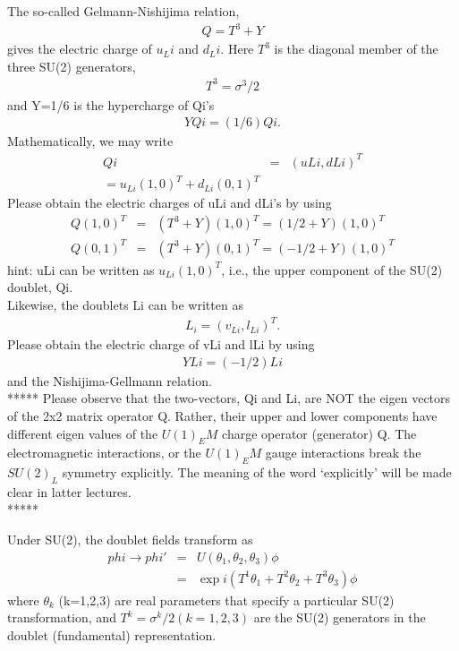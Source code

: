 \documentclass[12pt]{article}
\begin{document}
  The so-called Gelmann-Nishijima relation,
\begin{eqnarray}
  Q = T^3 + Y
\end{eqnarray}
  gives the electric charge of $u_Li$ and $d_Li$.  Here $T^3$ is the
  diagonal member of the three SU(2) generators,
  \begin{eqnarray}
  T^3 = \sigma^3 /2
  \end{eqnarray}
  and Y=1/6 is the hypercharge of Qi's
  \begin{eqnarray}
  Y Qi = (1/6) Qi .
  \end{eqnarray}
  Mathematically, we may write
  \begin{eqnarray}
  Qi &=& (uLi,dLi)^T \\
     = u_{Li} (1,0)^T + d_{Li} (0,1)^T
  \end{eqnarray}
  Please obtain the electric charges of uLi and dLi's
  by using
  \begin{eqnarray}
  Q (1,0)^T &=& (T^3 + Y) (1,0)^T = ( 1/2 + Y) (1,0)^T\\
  Q (0,1)^T &=& (T^3 + Y) (0,1)^T = (-1/2 + Y) (1,0)^T
  \end{eqnarray}
hint: uLi can be written as $u_{Li} (1,0)^T$, i.e., the upper
  component of the SU(2) doublet, Qi.\\

  Likewise, the doublets Li can be written as
  \begin{eqnarray}
  L_i = (v_{Li}, l_{Li})^T .
  \end{eqnarray}
  Please obtain the electric charge of vLi and lLi by using
  \begin{eqnarray}
  Y Li = (-1/2) Li
  \end{eqnarray}
  and the Nishijima-Gellmann relation.\\

  *****
  Please observe that the two-vectors, Qi and Li, are NOT the
  eigen vectors of the 2x2 matrix operator Q.  Rather, their
  upper and lower components have different eigen values of the
  $U(1)_EM$ charge operator (generator) Q.  The electromagnetic
  interactions, or the $U(1)_EM$ gauge interactions break the
  $SU(2)_L$ symmetry explicitly.  The meaning of the word `explicitly'
  will be made clear in latter lectures.\\
  *****

  Under SU(2), the doublet fields transform as
  \begin{eqnarray}
  phi \to phi' &=& U(\theta_1, \theta_2, \theta_3) \phi \\
              &=& \exp{ i (T^1 \theta_1 + T^2 \theta_2 + T^3 \theta_3) } \phi
  \end{eqnarray}
  where $\theta_k$ (k=1,2,3) are real parameters that specify a
  particular SU(2) transformation, and
  $T^k = \sigma^k/2 (k=1,2,3)$
  are the SU(2) generators in the doublet (fundamental) representation. \\
\end{document}
